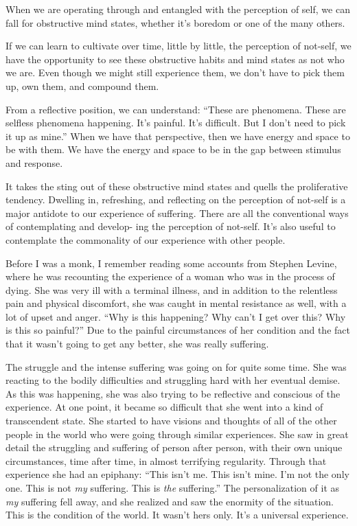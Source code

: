 When we are operating through and entangled with the perception of self, we can fall for obstructive mind states, whether it's boredom or one of the many others.

If we can learn to cultivate over time, little by little, the perception of not-self, we have the opportunity to see these obstructive habits and mind states as not who we are. Even though we might still experience them, we don't have to pick them up, own them, and compound them.

From a reflective position, we can understand: ``These are phenomena. These are selfless phenomena happening. It's painful. It's difficult. But I don't need to pick it up as mine.'' When we have that perspective, then we have energy and space to be with them. We have the energy and space to be in the gap between stimulus and response.

It takes the sting out of these obstructive mind states and quells the proliferative tendency. Dwelling in, refreshing, and reflecting on the perception of not-self
is \linebreak a major antidote to our experience of suffering. There are \linebreak all the conventional ways of contemplating and develop- \linebreak ing the perception of not-self. It's also useful to contemplate the commonality of our experience with other people.

Before I was a monk, I remember reading some accounts from Stephen Levine, where he was recounting the experience of a woman who was in the process of dying. She was very ill with a terminal illness, and in addition to the relentless pain and physical discomfort, she was caught in mental resistance as well, with a lot of upset and anger. ``Why is this happening? Why can't I get over this? Why is this so painful?'' Due to the painful circumstances of her condition and the fact that it wasn't going to get any better, she \linebreak was really suffering.

The struggle and the intense suffering was going on for quite some time. She was reacting to the bodily difficulties and struggling hard with her eventual demise. As this was happening, she was also trying to be reflective and conscious of the experience. At one point, it became so difficult that she went into a kind of transcendent state. She started to have visions and thoughts of all of the other people in the world who were going through similar experiences. She saw in great detail the struggling and suffering of \linebreak person after person, with their own unique circumstances, time after time, in almost terrifying regularity. Through that experience she had an epiphany: ``This isn't me. This isn't mine. I'm not the only one. This is not \emph{my} suffering. This is \emph{the} suffering.'' The personalization of it as \emph{my} suffering fell away, and she realized and saw the enormity of the situation. This is the condition of the world. It wasn't hers only. It's \linebreak a universal experience.

